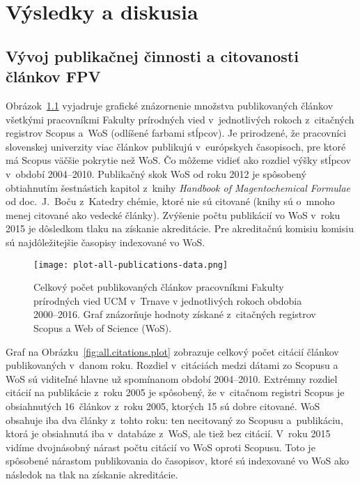\chapter{Výsledky a diskusia}
\label{chap:results}

\section{Vývoj publikačnej činnosti a citovanosti článkov FPV}

Obrázok~\ref{fig:all.publications.plot} vyjadruje grafické znázornenie množstva
publikovaných článkov všetkými pracovníkmi Fakulty prírodných vied
v~jednotlivých rokoch z~citačných registrov Scopus a~WoS (odlíšené farbami
stĺpcov).  Je prirodzené, že pracovníci slovenskej univerzity viac článkov
publikujú v~európskych časopisoch, pre ktoré má Scopus väčšie pokrytie než WoS.
Čo môžeme vidieť ako rozdiel výšky stĺpcov v~období 2004--2010.  Publikačný skok
WoS od roku 2012 je spôsobený obtiahnutím šestnástich kapitol z~knihy
\emph{Handbook of Magentochemical Formulae} od doc.~J.~Boču z~Katedry chémie,
ktoré nie sú citované (knihy sú o~mnoho menej citované ako vedecké články).
Zvýšenie počtu publikácií vo WoS v~roku 2015 je dôsledkom tlaku na získanie
akreditácie.  Pre akreditačnú komisiu komisiu sú najdôležitejšie časopisy
indexované vo WoS.

\begin{figure}
  \centering
  \texttt{[image: plot-all-publications-data.png]}
  \caption[Vývoj publikačnej činnosti pracovníkov FPV v~období 2000--2016]%
  {Celkový počet publikovaných článkov pracovníkmi Fakulty prírodných vied UCM
    v~Trnave v jednotlivých rokoch obdobia 2000--2016.  Graf znázorňuje hodnoty
    získané z~citač\-ných registrov Scopus a Web of Science (WoS).}
  \label{fig:all.publications.plot}
\end{figure}

Graf na Obrázku~\ref{fig:all.citations.plot} zobrazuje celkový počet citácií
článkov publikovaných v~danom roku.  Rozdiel v~citáciách medzi dátami zo Scopusu
a WoS sú viditeľné hlavne už spomínanom období 2004--2010.  Extrémny rozdiel
citácií na publikácie z~roku 2005 je spôsobený, že v~citačnom registri Scopus je
obsiahnutých 16~článkov z~roku 2005, ktorých 15 sú dobre citované.  WoS obsahuje
iba dva články z~tohto roku: ten necitovaný zo Scopusu a~publikáciu, ktorá je
obsiahnutá iba v~databáze z~WoS, ale tiež bez citácií.  V~roku 2015 vidíme
dvojnásobný nárast počtu citácií vo WoS oproti Scopusu.  Toto je spôsobené
nárastom publikovania do časopisov, ktoré sú indexované vo WoS ako následok na
tlak na získanie akreditácie.

